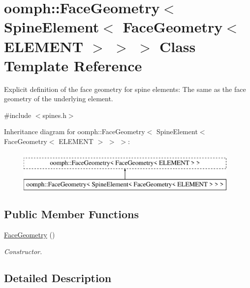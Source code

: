 \hypertarget{classoomph_1_1FaceGeometry_3_01SpineElement_3_01FaceGeometry_3_01ELEMENT_01_4_01_4_01_4}{}\section{oomph\+:\+:Face\+Geometry$<$ Spine\+Element$<$ Face\+Geometry$<$ E\+L\+E\+M\+E\+NT $>$ $>$ $>$ Class Template Reference}
\label{classoomph_1_1FaceGeometry_3_01SpineElement_3_01FaceGeometry_3_01ELEMENT_01_4_01_4_01_4}


Explicit definition of the face geometry for spine elements\+: The same as the face geometry of the underlying element.  




{\ttfamily \#include $<$spines.\+h$>$}

Inheritance diagram for oomph\+:\+:Face\+Geometry$<$ Spine\+Element$<$ Face\+Geometry$<$ E\+L\+E\+M\+E\+NT $>$ $>$ $>$\+:\begin{figure}[H]
\begin{center}
\leavevmode
\includegraphics[height=2.000000cm]{classoomph_1_1FaceGeometry_3_01SpineElement_3_01FaceGeometry_3_01ELEMENT_01_4_01_4_01_4}
\end{center}
\end{figure}
\subsection*{Public Member Functions}
\begin{DoxyCompactItemize}
\item 
\hyperlink{classoomph_1_1FaceGeometry_3_01SpineElement_3_01FaceGeometry_3_01ELEMENT_01_4_01_4_01_4_af985d26706328d84f9d381ba1c8c5224}{Face\+Geometry} ()
\begin{DoxyCompactList}\small\item\em Constructor. \end{DoxyCompactList}\end{DoxyCompactItemize}


\subsection{Detailed Description}
